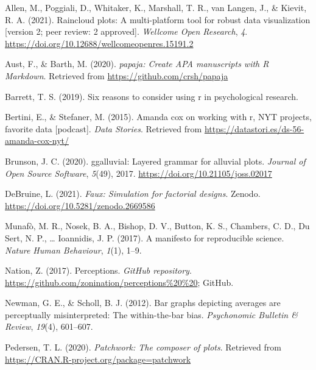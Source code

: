 \documentclass[
  english,
  doc,floatsintext]{apa6}
\newlength{\cslhangindent}
\newlength{\cslentryspacingunit} %
\newenvironment{CSLReferences}[2] %
 {%
  \setlength{\parindent}{0pt}
  \ifodd #1
  \let\oldpar\par
  \def\par{\hangindent=\cslhangindent\oldpar}
  \fi
  \setlength{\parskip}{#2\cslentryspacingunit}
 }%
 {}
\begin{document}
\hypertarget{refs}{}
\begin{CSLReferences}{1}{0}
\leavevmode{}%
Allen, M., Poggiali, D., Whitaker, K., Marshall, T. R., van Langen, J., \& Kievit, R. A. (2021). Raincloud plots: A multi-platform tool for robust data visualization {[}version 2; peer review: 2 approved{]}. \emph{Wellcome Open Research}, \emph{4}. \url{https://doi.org/10.12688/wellcomeopenres.15191.2}

\leavevmode{}%
Aust, F., \& Barth, M. (2020). \emph{{papaja}: {Create} {APA} manuscripts with {R Markdown}}. Retrieved from \url{https://github.com/crsh/papaja}

\leavevmode{}%
Barrett, T. S. (2019). Six reasons to consider using r in psychological research.

\leavevmode{}%
Bertini, E., \& Stefaner, M. (2015). Amanda cox on working with r, NYT projects, favorite data {[}podcast{]}. \emph{Data Stories}. Retrieved from \url{https://datastori.es/ds-56-amanda-cox-nyt/}

\leavevmode{}%
Brunson, J. C. (2020). {ggalluvial}: Layered grammar for alluvial plots. \emph{Journal of Open Source Software}, \emph{5}(49), 2017. \url{https://doi.org/10.21105/joss.02017}

\leavevmode{}%
DeBruine, L. (2021). \emph{Faux: Simulation for factorial designs}. Zenodo. \url{https://doi.org/10.5281/zenodo.2669586}

\leavevmode{}%
Munafò, M. R., Nosek, B. A., Bishop, D. V., Button, K. S., Chambers, C. D., Du Sert, N. P., \ldots{} Ioannidis, J. P. (2017). A manifesto for reproducible science. \emph{Nature Human Behaviour}, \emph{1}(1), 1--9.

\leavevmode{}%
Nation, Z. (2017). Perceptions. \emph{GitHub repository}. \url{https://github.com/zonination/perceptions\%20\%20}; GitHub.

\leavevmode{}%
Newman, G. E., \& Scholl, B. J. (2012). Bar graphs depicting averages are perceptually misinterpreted: The within-the-bar bias. \emph{Psychonomic Bulletin \& Review}, \emph{19}(4), 601--607.

\leavevmode{}%
Pedersen, T. L. (2020). \emph{Patchwork: The composer of plots}. Retrieved from \url{https://CRAN.R-project.org/package=patchwork}


\end{CSLReferences}
\end{document}
